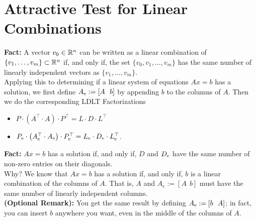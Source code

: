\vspace*{.2cm}



\section{Attractive Test for Linear Combinations}
\label{sec:AttractiveTestLinearCombination}

\begin{tcolorbox}[sharp corners, colback=green!30, colframe=green!80!blue,
title=\textbf{Pro Tip! Linear Combination or Not?}]
\textbf{Fact:} A vector $v_0\in \mathbb R^n$ can be written as a linear combination of $\{v_1, \ldots, v_m\} \subset \mathbb R^n$  if, and only if, the set $\{v_0, v_1, \ldots, v_m\}$ has the same number of linearly independent vectors as $\{v_1, \ldots, v_m\}$.\\

Applying this to determining if a linear system of equations $Ax=b$ has a solution, we first define $A_{\rm e} :=\left[A~~ b \right]$ by appending $b$ to the columns of $A$. Then we do the corresponding LDLT Factorizations
\begin{itemize}
    \item $P \cdot \left(A^\top \cdot A \right)\cdot P^\top = L \cdot D \cdot L^\top$
    \item $P_{\rm e} \cdot \left(A_{\rm e}^\top \cdot A_{\rm e}  \right) \cdot P^\top_{\rm e} = L_{\rm e} \cdot D_{\rm e} \cdot L^\top_{\rm e} $.
\end{itemize}

\textbf{Fact:}  $Ax=b$ has a solution if, and only if, $D$ and $D_{\rm e}$ have the same number of non-zero entries on their diagonals.\\

Why? We know that $Ax=b$ has a solution if, and only if, $b$ is a linear combination of the columns of $A$. That is, $A$ and $A_e:=[A~~b]$ must have the same number of linearly independent columns.\\

\textbf{(Optional Remark):} You get the same result by defining $A_{\rm e} :=\left[b~~ A \right]$; in fact, you can insert $b$ anywhere you want, even in the middle of the columns of $A$.
\end{tcolorbox}

\vspace*{.5cm}

